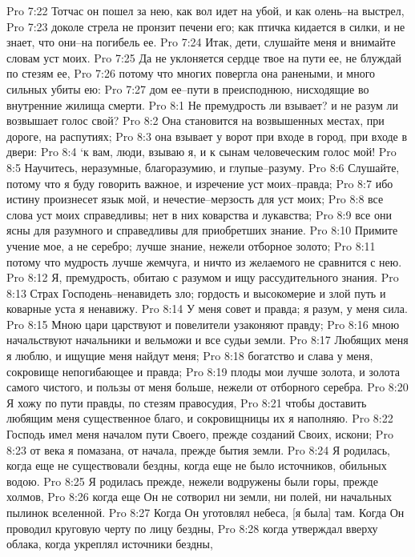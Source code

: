 Pro 7:22  Тотчас он пошел за нею, как вол идет на убой, и как олень--на выстрел,
Pro 7:23  доколе стрела не пронзит печени его; как птичка кидается в силки, и не знает, что они--на погибель ее.
Pro 7:24  Итак, дети, слушайте меня и внимайте словам уст моих.
Pro 7:25  Да не уклоняется сердце твое на пути ее, не блуждай по стезям ее,
Pro 7:26  потому что многих повергла она ранеными, и много сильных убиты ею:
Pro 7:27  дом ее--пути в преисподнюю, нисходящие во внутренние жилища смерти.
Pro 8:1  Не премудрость ли взывает? и не разум ли возвышает голос свой?
Pro 8:2  Она становится на возвышенных местах, при дороге, на распутиях;
Pro 8:3  она взывает у ворот при входе в город, при входе в двери:
Pro 8:4  `к вам, люди, взываю я, и к сынам человеческим голос мой!
Pro 8:5  Научитесь, неразумные, благоразумию, и глупые--разуму.
Pro 8:6  Слушайте, потому что я буду говорить важное, и изречение уст моих--правда;
Pro 8:7  ибо истину произнесет язык мой, и нечестие--мерзость для уст моих;
Pro 8:8  все слова уст моих справедливы; нет в них коварства и лукавства;
Pro 8:9  все они ясны для разумного и справедливы для приобретших знание.
Pro 8:10  Примите учение мое, а не серебро; лучше знание, нежели отборное золото;
Pro 8:11  потому что мудрость лучше жемчуга, и ничто из желаемого не сравнится с нею.
Pro 8:12  Я, премудрость, обитаю с разумом и ищу рассудительного знания.
Pro 8:13  Страх Господень--ненавидеть зло; гордость и высокомерие и злой путь и коварные уста я ненавижу.
Pro 8:14  У меня совет и правда; я разум, у меня сила.
Pro 8:15  Мною цари царствуют и повелители узаконяют правду;
Pro 8:16  мною начальствуют начальники и вельможи и все судьи земли.
Pro 8:17  Любящих меня я люблю, и ищущие меня найдут меня;
Pro 8:18  богатство и слава у меня, сокровище непогибающее и правда;
Pro 8:19  плоды мои лучше золота, и золота самого чистого, и пользы от меня больше, нежели от отборного серебра.
Pro 8:20  Я хожу по пути правды, по стезям правосудия,
Pro 8:21  чтобы доставить любящим меня существенное благо, и сокровищницы их я наполняю.
Pro 8:22  Господь имел меня началом пути Своего, прежде созданий Своих, искони;
Pro 8:23  от века я помазана, от начала, прежде бытия земли.
Pro 8:24  Я родилась, когда еще не существовали бездны, когда еще не было источников, обильных водою.
Pro 8:25  Я родилась прежде, нежели водружены были горы, прежде холмов,
Pro 8:26  когда еще Он не сотворил ни земли, ни полей, ни начальных пылинок вселенной.
Pro 8:27  Когда Он уготовлял небеса, [я была] там. Когда Он проводил круговую черту по лицу бездны,
Pro 8:28  когда утверждал вверху облака, когда укреплял источники бездны,
